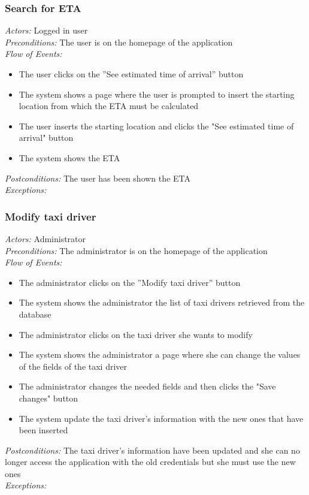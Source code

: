 \documentclass{article}
\begin{document}
	\subsubsection{Search for ETA}
	\textit{Actors:} Logged in user
	\\\textit{Preconditions:} The user is on the homepage of the application
	\\\textit{Flow of Events:}
	\begin{itemize}
		\item  The user clicks on the ''See estimated time of arrival'' button
		\item  The system shows a page where the user is prompted to insert the starting location from which the ETA must be calculated
		\item  The user inserts the starting location and clicks the "See estimated time of arrival" button
		\item  The system shows the ETA 
	\end{itemize}
	\textit{Postconditions:} The user has been shown the ETA
	\\\textit{Exceptions:}
	
	\subsubsection{Modify taxi driver}
	\textit{Actors:} Administrator
	\\\textit{Preconditions:} The administrator is on the homepage of the application
	\\\textit{Flow of Events:}
	\begin{itemize}
		\item  The administrator clicks on the ''Modify taxi driver'' button
		\item  The system shows the administrator the list of taxi drivers retrieved from the database
		\item  The administrator clicks on the taxi driver she wants to modify
		\item  The system shows the administrator a page where she can change the values of the fields of the taxi driver
		\item  The administrator changes the needed fields and then clicks the "Save changes" button
		\item  The system update the taxi driver's information with the new ones that have been inserted
	\end{itemize}
	\textit{Postconditions:} The taxi driver's information have been updated and she can no longer access the application with the old credentials but she must use the new ones
	\\\textit{Exceptions:} %
	
\end{document}
